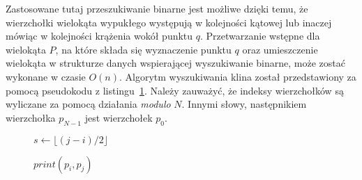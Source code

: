 




Zastosowane tutaj przeszukiwanie binarne jest możliwe dzięki temu, że
wierzchołki wielokąta wypukłego występują w kolejności kątowej lub
inaczej mówiąc w kolejności krążenia wokół punktu $q$. Przetwarzanie
wstępne dla wielokąta $P$, na które składa się wyznaczenie punktu $q$
oraz umieszczenie wielokąta w strukturze danych wspierającej
wyszukiwanie binarne, może zostać wykonane w czasie $O(n)$. Algorytm
wyszukiwania klina został przedstawiony za pomocą pseudokodu z
listingu~\ref{alg:findwedge}. Należy zauważyć, że indeksy wierzchołków
są wyliczane za pomocą działania \emph{modulo} $N$. Innymi słowy,
następnikiem wierzchołka $p_{N-1}$ jest wierzchołek $p_0$.


\begin{figure}[htp]
  \begin{algorithmic}[1]


    \State

    \Else
    \EndIf

    \State

        \State $s \gets \lfloor (j-i)/2 \rfloor$

        \State

        \Else
        \EndIf
    \EndWhile

    \State

    \State $print(p_i, p_j)$

    \EndProcedure

    \end{algorithmic}
    \caption{\label{alg:findwedge}}
  \end{figure}

